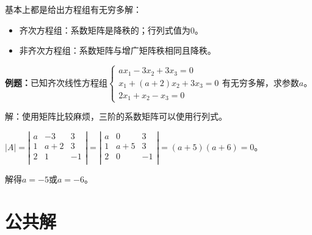 \documentclass[UTF8, 12pt]{ctexart}
\begin{document}
基本上都是给出方程组有无穷多解：

\begin{itemize}
    \item 齐次方程组：系数矩阵是降秩的；行列式值为0。
    \item 非齐次方程组：系数矩阵与增广矩阵秩相同且降秩。
\end{itemize}

\textbf{例题：}已知齐次线性方程组$\left\{\begin{array}{l}
    ax_1-3x_2+3x_3=0 \\
    x_1+(a+2)x_2+3x_3=0 \\
    2x_1+x_2-x_3=0
\end{array}\right.$有无穷多解，求参数$a$。

解：使用矩阵比较麻烦，三阶的系数矩阵可以使用行列式。

$\vert A\vert=\left\vert\begin{array}{ccc}
    a & -3 & 3 \\
    1 & a+2 & 3 \\
    2 & 1 & -1 \\
\end{array}\right\vert=\left\vert\begin{array}{ccc}
    a & 0 & 3 \\
    1 & a+5 & 3 \\
    2 & 0 & -1 \\
\end{array}\right\vert=(a+5)(a+6)=0$。

解得$a=-5$或$a=-6$。

\section{公共解}
\end{document}
